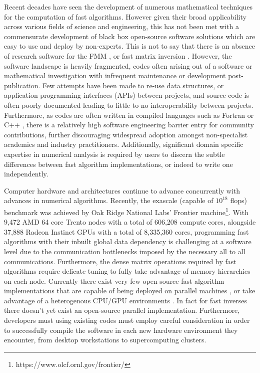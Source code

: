 Recent decades have seen the development of numerous mathematical techniques for the computation of fast algorithms. However given their broad applicability across various fields of science and engineering, this has not been met with a commensurate development of black box open-source software solutions which are easy to use and deploy by non-experts. This is not to say that there is an absence of research software for the FMM \cite{kailasa2022pyexafmm, exafmm,wang2021exafmm,malhotra2015pvfmm, fmm3d}, or fast matrix inversion \cite{fmm3dbie, strongskel, ho2020flam}. However, the software landscape is heavily fragmented, codes often arising out of a software or mathematical investigation with infrequent maintenance or development post-publication. Few attempts have been made to re-use data structures, or application programming interfaces (\gls{API}s) between projects, and source code is often poorly documented leading to little to no interoperability between projects. Furthermore, as codes are often written in compiled languages such as Fortran \cite{fmm3d} or C++ \cite{malhotra2015pvfmm, exafmm,wang2021exafmm}, there is a relatively high software engineering barrier entry for community contributions, further discouraging widespread adoption amongst non-specialist academics and industry practitioners. Additionally, significant domain specific expertise in numerical analysis is required by users to discern the subtle differences between fast algorithm implementations, or indeed to write one independently. 

Computer hardware and architectures continue to advance concurrently with advances in numerical algorithms. Recently, the exascale (capable of $10^{18}$ \gls{flops}) benchmark was achieved by Oak Ridge National Labs' Frontier machine\footnote{https://www.olcf.ornl.gov/frontier/}. With  9,472 AMD 64 core Trento nodes with a total of 606,208 compute cores, alongside 37,888 Radeon Instinct GPUs with a total of 8,335,360 cores, programming fast algorithms with their inbuilt global data dependency is challenging at a software level due to the communication bottlenecks imposed by the necessary all to all communications. Furthermore, the dense matrix operations required by fast algorithms require delicate tuning to fully take advantage of memory hierarchies on each node. Currently there exist very few open-source fast algorithm implementations that are capable of being deployed on parallel machines \cite{malhotra2015pvfmm, exafmm}, or take advantage of a heterogenous CPU/GPU environments \cite{exafmm}. In fact for fast inverses there doesn't yet exist an open-source parallel implementation. Furthermore, developers must using existing codes must employ careful consideration in order to successfully compile the software in each new hardware environment they encounter, from desktop workstations to supercomputing clusters.

